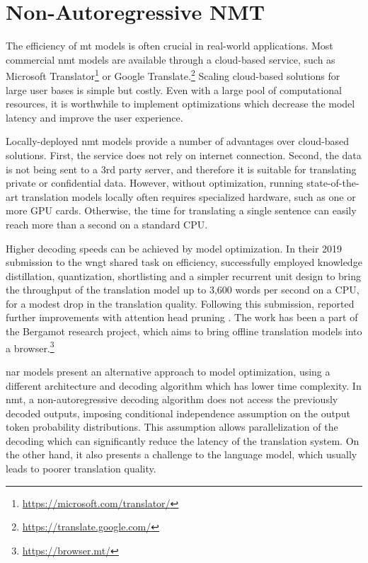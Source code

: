 \chapter{Non-Autoregressive NMT}
\label{chap:nat}

The efficiency of \ac{mt} models is often crucial in real-world applications.
Most commercial \ac{nmt} models are available through a cloud-based service,
such as Microsoft Translator\footnote{\url{https://microsoft.com/translator/}}
or Google Translate.\footnote{\url{https://translate.google.com/}} Scaling
cloud-based solutions for large user bases is simple but costly. Even with a
large pool of computational resources, it is worthwhile to implement
optimizations which decrease the model latency and improve the user experience.

Locally-deployed \ac{nmt} models provide a number of advantages over
cloud-based solutions. First, the service does not rely on internet
connection. Second, the data is not being sent to a 3rd party server, and
therefore it is suitable for translating private or confidential data.
However, without optimization, running state-of-the-art translation models
locally often requires specialized hardware, such as one or more GPU
cards. Otherwise, the time for translating a single sentence can easily reach
more than a second on a standard CPU.

Higher decoding speeds can be achieved by model optimization. In their 2019
submission to the \ac{wngt} shared task on efficiency,
\citet{kim-etal-2019-research} successfully employed knowledge distillation,
quantization, shortlisting \citep{jean-etal-2015-using} and a simpler recurrent
unit design to bring the throughput of the translation model up to 3,600 words
per second on a CPU, for a modest drop in the translation quality. Following
this submission, \citet{bogoychev-etal-2020-edinburghs} reported further
improvements with attention head pruning \citep{voita-etal-2019-analyzing}. The
work has been a part of the Bergamot research project, which aims to bring
offline translation models into a browser.\footnote{\url{https://browser.mt/}}

\Ac{nar} models present an alternative approach to model optimization, using a
different architecture and decoding algorithm which has lower time complexity.
In \ac{nmt}, a non-autoregressive decoding algorithm does not access the
previously decoded outputs, imposing conditional independence assumption on the
output token probability distributions. This assumption allows parallelization
of the decoding which can significantly reduce the latency of the translation
system. On the other hand, it also presents a challenge to the language model,
which usually leads to poorer translation quality.

